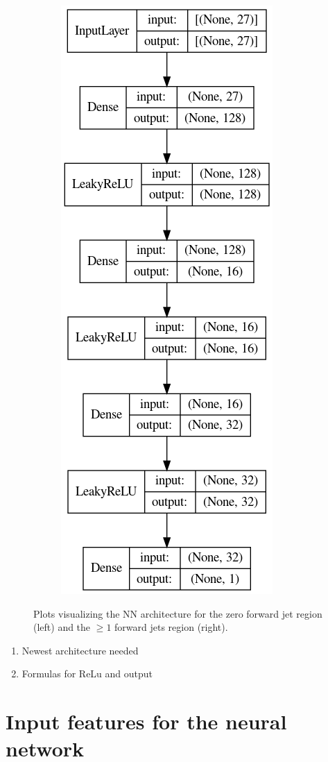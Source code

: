 \begin{figure}
\begin{subfigure}{.5\textwidth}
      \includegraphics[width=.5\linewidth]{Plots/model_1fj.png}
    \end{subfigure}
    \caption{Plots visualizing the NN architecture for the zero forward jet region (left) and the $\geq 1$ forward jets region (right).}
    \label{fig:models}
    \end{figure}
\begin{enumerate}
    \item Newest architecture needed
    \item Formulas for ReLu and output
\end{enumerate}
\section{Input features for the neural network}

